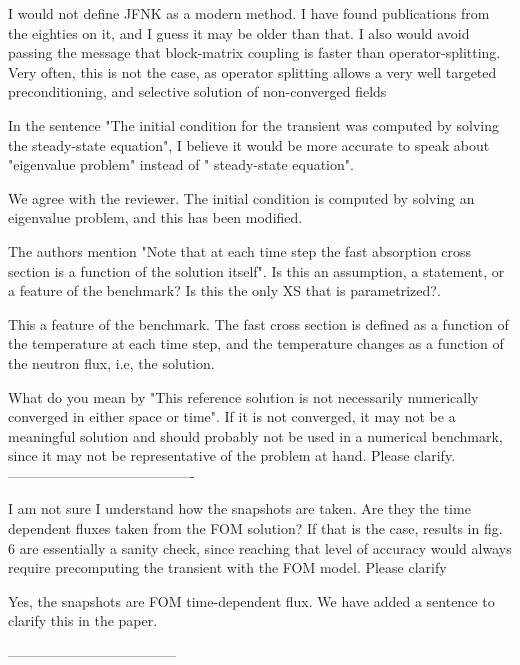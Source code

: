 \documentclass[10pt]{article}
\begin{document}
\begin{response}{I would not define JFNK as a modern method. I have found publications from the eighties on it, and I guess it may be older than that. I also would avoid passing the message that block-matrix coupling is faster than operator-splitting. Very often, this is not the case, as operator splitting allows a very well targeted preconditioning, and selective solution of non-converged fields
   }

  

\end{response}

\begin{response}{
 In the sentence "The initial condition for the transient was computed by solving the steady-state equation", I believe it would be more accurate to speak about "eigenvalue problem" instead of " steady-state equation".}

We agree with the reviewer. The initial condition is computed by solving an eigenvalue problem, and this has been modified.

\end{response}

\begin{response}{The authors mention "Note that at each time step the fast absorption cross section is a function of the solution itself". Is this an assumption, a statement, or a feature of the benchmark? Is this the only XS that is parametrized?.}
		
This a feature of the benchmark. The fast cross section is defined as a function of the temperature at each time step, and the temperature changes as a function of the neutron flux, i.e, the solution.
\end{response}

\begin{response}
  {What do you mean by "This reference solution is not necessarily numerically converged in either space or time". If it is not converged, it may not be a meaningful solution and should probably not be used in a numerical benchmark, since it may not be representative of the problem at hand. Please clarify.}
  ----------------------------------------
	
\end{response}

\begin{response}
	{ I am not sure I understand how the snapshots are taken. Are they the time dependent fluxes taken from the FOM solution? If that is the case, results in fig. 6 are essentially a sanity check, since reaching that level of accuracy would always require precomputing the transient with the FOM model. Please clarify}
	
	Yes, the snapshots are FOM time-dependent flux. We have added a sentence to clarify this in the paper.
	
------------------------------------
\end{response}
\end{document}
